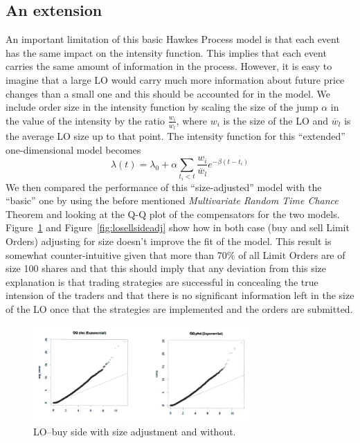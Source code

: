 \subsection{An extension}


An important limitation of this basic Hawkes Process model is that each event has the same impact on the intensity function. This implies that each event carries the same amount of information in the process. However, it is easy to imagine that a large LO would carry much more information about future price changes than a small one and this should be accounted for in the model. We include order size in the intensity function by scaling the size of the jump $\alpha$ in the value of the intensity by the ratio $\frac{w_i}{\overline{w}_l}$, where $w_i$ is the size of the LO and $\overline{w}_l$ is the average LO size up to that point. The intensity function for this ``extended'' one-dimensional model becomes
	\[
	\lambda(t)= \lambda_0 + \alpha \sum_{t_i<t} \dfrac{w_i}{\overline{w}_l} e^{-\beta(t-t_i)}
	\]
We then compared the performance of this ``size-adjusted'' model with the ``basic'' one by using the before mentioned \emph{Multivariate Random Time Chance} Theorem and looking at the Q-Q plot of the compensators for the two models. Figure~\ref{fig:lobuysideadj} and Figure~\ref{fig:losellsideadj} show how in both case (buy and sell Limit Orders) adjusting for size doesn't improve the fit of the model. This result is somewhat counter-intuitive given that more than 70\% of all Limit Orders are of size 100 shares and that this should imply that any deviation from this size explanation is that trading strategies are successful in concealing the true intension of the traders and that there is no significant information left in the size of the LO once that the strategies are implemented and the orders are submitted. 
	\begin{figure}[!ht]
   	\centering
   	\includegraphics[width=0.75\textwidth]{chapters/chapter_el_exch/figures/lobuysideadj.png} 
   	\caption{LO--buy side with size adjustment and without. \label{fig:lobuysideadj}}
	\end{figure}
